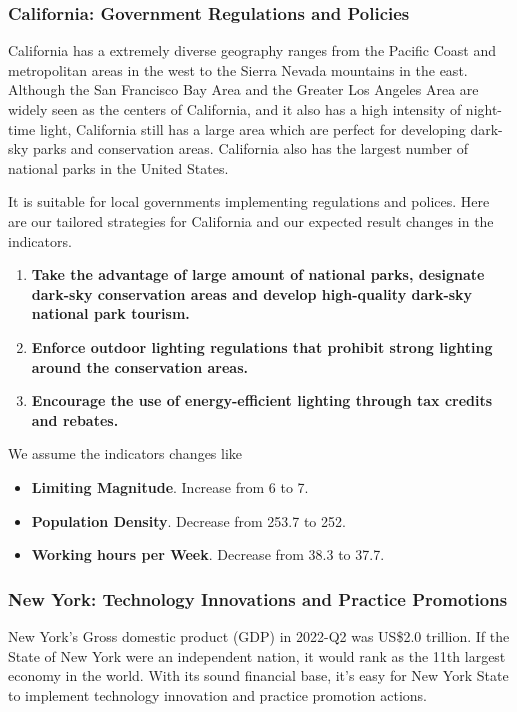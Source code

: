 \subsubsection{California: Government Regulations and Policies}
California has a extremely diverse geography ranges from the Pacific Coast and metropolitan areas in the west to the Sierra Nevada mountains in the east. Although the San Francisco Bay Area and the Greater Los Angeles Area are widely seen as the centers of California, and it also has a high intensity of night-time light, California still has a large area which are perfect for developing dark-sky parks and conservation areas. California also has the largest number of national parks in the United States.

It is suitable for local governments implementing regulations and polices. Here are our tailored strategies for California and our expected result changes in the indicators.

\begin{enumerate}
    \item \textbf{Take the advantage of large amount of national parks, designate dark-sky conservation areas and develop high-quality dark-sky national park tourism.} 

    \item \textbf{Enforce outdoor lighting regulations that prohibit strong lighting around the conservation areas.}
    
    \item \textbf{Encourage the use of energy-efficient lighting through tax credits and rebates.}

\end{enumerate}

We assume the indicators changes like
\begin{itemize}
    \item \textbf{Limiting Magnitude}. Increase from 6 to 7.
    \item \textbf{Population Density}. Decrease from 253.7 to 252.
    \item \textbf{Working hours per Week}. Decrease from 38.3 to 37.7.
\end{itemize}

\subsubsection{New York: Technology Innovations and Practice Promotions}

New York's Gross domestic product (GDP) in 2022-Q2 was US\$2.0 trillion. If the State of New York were an independent nation, it would rank as the 11th largest economy in the world. With its sound financial base, it's easy for New York State to implement technology innovation and practice promotion actions.

